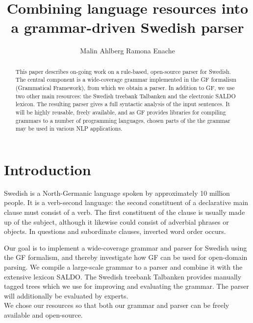 \documentclass[submission]{eptcs} %
\title{%
        Combining language resources into a grammar-driven Swedish parser}
\author{Malin Ahlberg \qquad\qquad Ramona Enache
\institute{Department of Computer Science \& Engineering, Gothenburg University, Sweden}
}
\begin{document}
\maketitle

\begin{abstract}
This paper describes on-going work on a rule-based, open-source
parser for Swedish. The central component is a wide-coverage grammar
implemented in the GF formalism (Grammatical Framework), from which
we obtain a %
parser.
In addition to GF, we use two other main resources: the Swedish
treebank Talbanken and the electronic SALDO lexicon.
The resulting parser 
gives a full syntactic analysis of the input sentences.
It will be highly reusable, freely available,
and as GF provides libraries for compiling
grammars to a number of programming languages,
chosen parts of the the 
grammar may be used in various NLP applications. %

\end{abstract}

\section{Introduction}
Swedish is a North-Germanic language spoken by approximately 10 million people.
It is a verb-second language: the second constituent of a declarative main
clause must consist of a verb.
The first constituent of the clause is usually made up of the subject,
although it likewise could consist of adverbial phrases or objects.
In questions and subordinate clauses, inverted word order occurs.

Our goal is to implement a wide-coverage grammar and parser for Swedish
using the GF formalism, and 
thereby investigate how GF can be used for open-domain parsing.
We compile a large-scale grammar to a parser
and combine it with the extensive lexicon SALDO. The Swedish treebank 
Talbanken provides manually tagged trees which we use for improving and evaluating
the grammar. The parser will additionally
be evaluated by experts. \\
We chose our resources so that both our grammar and parser can 
be freely available and open-source. 
\end{document}
